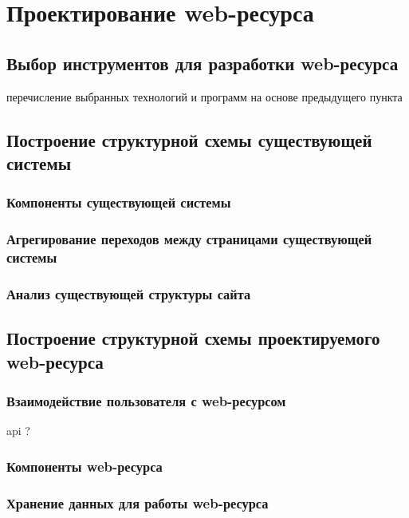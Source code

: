 
\section{Проектирование web-ресурса}
    \subsection{Выбор инструментов для разработки web-ресурса}
        перечисление выбранных технологий и программ на основе предыдущего пункта
        
    \subsection{Построение структурной схемы существующей системы}
        \subsubsection{Компоненты существующей системы}                                         %

        \subsubsection{Агрегирование переходов между страницами существующей системы}          %

        \subsubsection{Анализ существующей структуры сайта}                                   %

    \subsection{Построение структурной схемы проектируемого web-ресурса}
        \subsubsection{Взаимодействие пользователя с web-ресурсом}                            %
            api ?

        \subsubsection{Компоненты web-ресурса}                                                %

        \subsubsection{Хранение данных для работы web-ресурса}                                  %
    

\clearpage
